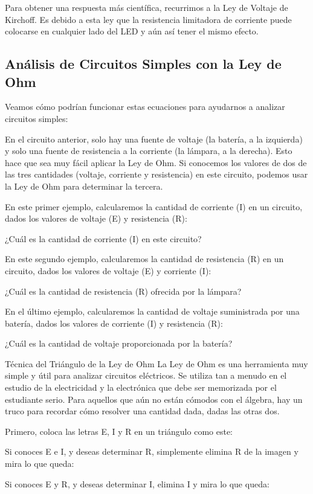 \documentclass[output=paper, 
colorlinks,
citecolor=brown,
newtxmath
]{langscibook}
\begin{document}
Para obtener una respuesta más científica, recurrimos a la Ley de Voltaje de Kirchoff. Es debido a esta ley que la resistencia limitadora de corriente puede colocarse en cualquier lado del LED y aún así tener el mismo efecto.

\subsection{Análisis de Circuitos Simples con la Ley de Ohm}
Veamos cómo podrían funcionar estas ecuaciones para ayudarnos a analizar circuitos simples:

En el circuito anterior, solo hay una fuente de voltaje (la batería, a la izquierda) y solo una fuente de resistencia a la corriente (la lámpara, a la derecha). Esto hace que sea muy fácil aplicar la Ley de Ohm. Si conocemos los valores de dos de las tres cantidades (voltaje, corriente y resistencia) en este circuito, podemos usar la Ley de Ohm para determinar la tercera.

En este primer ejemplo, calcularemos la cantidad de corriente (I) en un circuito, dados los valores de voltaje (E) y resistencia (R):

¿Cuál es la cantidad de corriente (I) en este circuito?

En este segundo ejemplo, calcularemos la cantidad de resistencia (R) en un circuito, dados los valores de voltaje (E) y corriente (I):

¿Cuál es la cantidad de resistencia (R) ofrecida por la lámpara?

En el último ejemplo, calcularemos la cantidad de voltaje suministrada por una batería, dados los valores de corriente (I) y resistencia (R):

¿Cuál es la cantidad de voltaje proporcionada por la batería?

Técnica del Triángulo de la Ley de Ohm
La Ley de Ohm es una herramienta muy simple y útil para analizar circuitos eléctricos. Se utiliza tan a menudo en el estudio de la electricidad y la electrónica que debe ser memorizada por el estudiante serio. Para aquellos que aún no están cómodos con el álgebra, hay un truco para recordar cómo resolver una cantidad dada, dadas las otras dos.

Primero, coloca las letras E, I y R en un triángulo como este:

Si conoces E e I, y deseas determinar R, simplemente elimina R de la imagen y mira lo que queda:

Si conoces E y R, y deseas determinar I, elimina I y mira lo que queda:
\end{document}
